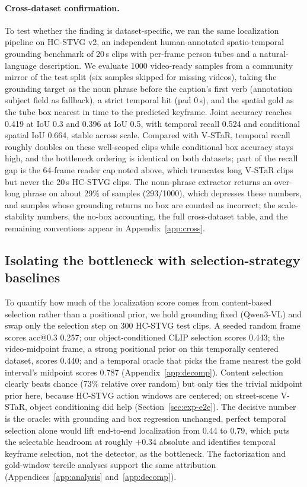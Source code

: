 \documentclass[10pt]{article}
\begin{document}
\paragraph{Cross-dataset confirmation.}
To test whether the finding is dataset-specific, we ran the same localization pipeline on HC-STVG v2, an independent human-annotated spatio-temporal grounding benchmark of 20\,s clips with per-frame person tubes and a natural-language description. We evaluate 1000 video-ready samples from a community mirror of the test split (six samples skipped for missing videos), taking the grounding target as the noun phrase before the caption's first verb (annotation subject field as fallback), a strict temporal hit (pad 0\,s), and the spatial gold as the tube box nearest in time to the predicted keyframe. Joint accuracy reaches 0.419 at IoU 0.3 and 0.396 at IoU 0.5, with temporal recall 0.524 and conditional spatial IoU 0.664, stable across scale. Compared with V-STaR, temporal recall roughly doubles on these well-scoped clips while conditional box accuracy stays high, and the bottleneck ordering is identical on both datasets; part of the recall gap is the 64-frame reader cap noted above, which truncates long V-STaR clips but never the 20\,s HC-STVG clips. The noun-phrase extractor returns an over-long phrase on about 29\% of samples (293/1000), which depresses these numbers, and samples whose grounding returns no box are counted as incorrect; the scale-stability numbers, the no-box accounting, the full cross-dataset table, and the remaining conventions appear in Appendix~\ref{app:cross}.

\subsection{Isolating the bottleneck with selection-strategy baselines}\label{sec:exp-oracle}

To quantify how much of the localization score comes from content-based selection rather than a positional prior, we hold grounding fixed (Qwen3-VL) and swap only the selection step on 300 HC-STVG test clips. A seeded random frame scores acc@0.3 0.257; our object-conditioned CLIP selection scores 0.443; the video-midpoint frame, a strong positional prior on this temporally centered dataset, scores 0.440; and a temporal oracle that picks the frame nearest the gold interval's midpoint scores 0.787 (Appendix~\ref{app:decomp}). Content selection clearly beats chance (73\% relative over random) but only ties the trivial midpoint prior here, because HC-STVG action windows are centered; on street-scene V-STaR, object conditioning did help (Section~\ref{sec:exp-e2e}). The decisive number is the oracle: with grounding and box regression unchanged, perfect temporal selection alone would lift end-to-end localization from 0.44 to 0.79, which puts the selectable headroom at roughly $+0.34$ absolute and identifies temporal keyframe selection, not the detector, as the bottleneck. The factorization and gold-window tercile analyses support the same attribution (Appendices~\ref{app:analysis} and~\ref{app:decomp}).
\end{document}
